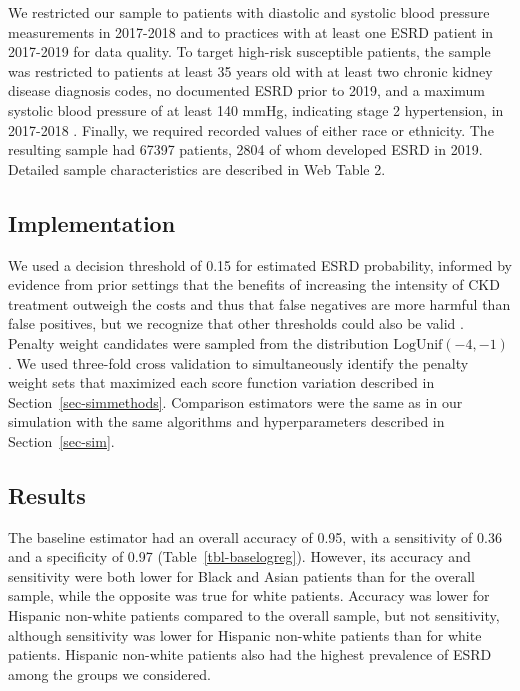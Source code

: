 \documentclass[
  12pt]{article}
\begin{document}
We restricted our sample to patients with diastolic and systolic blood
pressure measurements in 2017-2018 and to practices with at least one
ESRD patient in 2017-2019 for data quality. To target high-risk
susceptible patients, the sample was restricted to patients at least 35
years old with at least two chronic kidney disease diagnosis codes, no
documented ESRD prior to 2019, and a maximum systolic blood pressure of
at least 140 mmHg, indicating stage 2 hypertension, in 2017-2018
\citep{hsu_elevated_2005, cusick_balancing_2025}. Finally, we required
recorded values of either race or ethnicity. The resulting sample had
67397 patients, 2804 of whom developed ESRD in 2019. Detailed sample
characteristics are described in Web Table 2.

\subsection{Implementation}\label{implementation}

We used a decision threshold of 0.15 for estimated ESRD probability,
informed by evidence from prior settings that the benefits of increasing
the intensity of CKD treatment outweigh the costs and thus that false
negatives are more harmful than false positives, but we recognize that
other thresholds could also be valid
\citep{tisdale_cost-effectiveness_2022}. Penalty weight candidates were
sampled from the distribution \(\text{LogUnif}(-4,-1)\). We used
three-fold cross validation to simultaneously identify the penalty
weight sets that maximized each score function variation described in
Section~\ref{sec-simmethods}. Comparison estimators were the same as in
our simulation with the same algorithms and hyperparameters described in
Section~\ref{sec-sim}.

\subsection{Results}\label{results}

The baseline estimator had an overall accuracy of 0.95, with a
sensitivity of 0.36 and a specificity of 0.97
(Table~\ref{tbl-baselogreg}). However, its accuracy and sensitivity were
both lower for Black and Asian patients than for the overall sample,
while the opposite was true for white patients. Accuracy was lower for
Hispanic non-white patients compared to the overall sample, but not
sensitivity, although sensitivity was lower for Hispanic non-white
patients than for white patients. Hispanic non-white patients also had
the highest prevalence of ESRD among the groups we considered.
\end{document}

